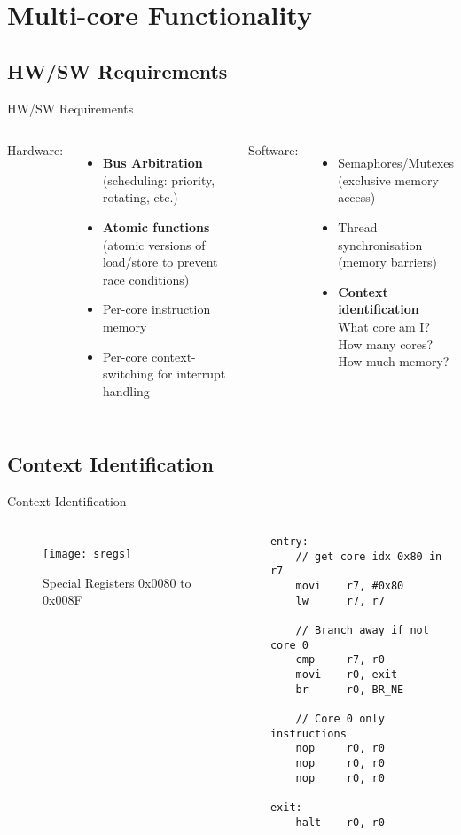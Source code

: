 \documentclass[aspectratio=169]{beamer}
\begin{document}
\section{Multi-core Functionality}
\frame{\tableofcontents[currentsection, subsectionstyle=show/show/hide]}
\subsection{HW/SW Requirements}
\begin{frame}{HW/SW Requirements}
\begin{columns}[t]
Hardware:
\begin{itemize}[<+->]
    \item \textbf{Bus Arbitration}\\ (scheduling: priority, rotating, etc.)
    \item \textbf{Atomic functions}\\ (atomic versions of load/store to prevent race conditions)
    \item Per-core instruction memory
    \item Per-core context-switching for interrupt handling
\end{itemize}
Software:
\begin{itemize}[<+->]
    \item Semaphores/Mutexes\\ (exclusive memory access)
    \item Thread synchronisation\\ (memory barriers)
    \item \textbf{Context identification}\\ What core am I?\\ How many cores?\\ How much memory?
\end{itemize}
\end{columns}
\end{frame}

\subsection{Context Identification}
\begin{frame}[fragile]{Context Identification}
\begin{columns}
\begin{figure}
\texttt{[image: sregs]}
\caption{Special Registers 0x0080 to 0x008F}
\end{figure}
\begin{lstlisting}[basicstyle=\scriptsize]
entry:
    // get core idx 0x80 in r7
    movi    r7, #0x80
    lw      r7, r7

    // Branch away if not core 0
    cmp     r7, r0
    movi    r0, exit
    br      r0, BR_NE 
    
    // Core 0 only instructions
    nop     r0, r0
    nop     r0, r0
    nop     r0, r0
    
exit:
    halt    r0, r0    
\end{lstlisting}
\end{columns}
\end{frame}
\end{document}
